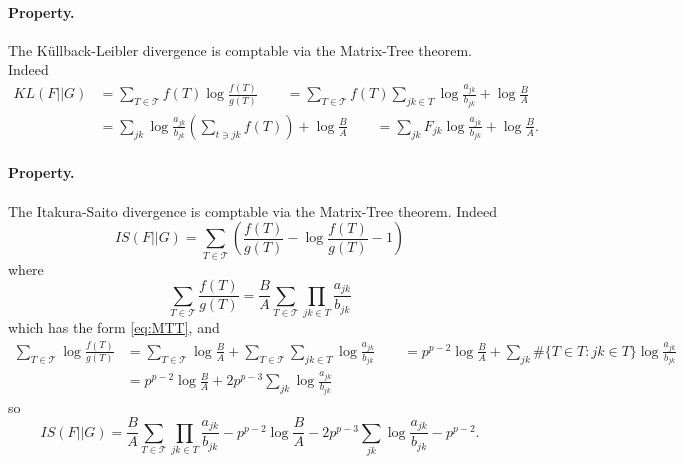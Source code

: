 \documentclass[a4paper, 10pt]{article}
\newcommand{\Tcal}{\mathcal{T}}
\begin{document}
\paragraph{Property.}  The Küllback-Leibler divergence is comptable via the Matrix-Tree theorem. Indeed
\begin{align*}
 KL(F || G) 
 & = \sum_{T \in \Tcal} f(T) \log \frac{f(T)}{g(T)} 
 \qquad = \sum_{T \in \Tcal}  f(T) \sum_{jk \in T} \log \frac{a_{jk}}{b_{jk}} + \log \frac{B}{A} \\
 & = \sum_{jk} \log \frac{a_{jk}}{b_{jk}} \left(\sum_{t \ni jk} f(T) \right) 
 + \log \frac{B}{A} 
 \qquad = \sum_{jk} F_{jk} \log \frac{a_{jk}}{b_{jk}} + \log \frac{B}{A}.
\end{align*}


\paragraph{Property.}  The Itakura-Saito divergence is comptable via the Matrix-Tree theorem. Indeed
$$
IS(F || G) 
= \sum_{T \in \Tcal} \left( \frac{f(T)}{g(T)} - \log \frac{f(T)}{g(T)} - 1 \right)
$$
where
$$
\sum_{T \in \Tcal} \frac{f(T)}{g(T)}
= \frac{B}{A} \sum_{T \in \Tcal}  \prod_{jk \in T} \frac{a_{jk}}{b_{jk}}
$$
which has the form \eqref{eq:MTT}, and
\begin{align*}
 \sum_{T \in \Tcal} \log \frac{f(T)}{g(T)} 
 & = \sum_{T \in \Tcal} \log \frac{B}{A} + \sum_{T \in \Tcal} \sum_{jk \in T} \log \frac{a_{jk}}{b_{jk}} 
 \qquad = p^{p-2} \log \frac{B}{A} + \sum_{jk} \#\{T \in T: jk \in T\} \log \frac{a_{jk}}{b_{jk}}  \\
 & = p^{p-2} \log \frac{B}{A} + 2p^{p-3}\sum_{jk} \log \frac{a_{jk}}{b_{jk}} 
\end{align*}
so
$$
IS(F || G) 
= \frac{B}{A} \sum_{T \in \Tcal} \prod_{jk \in T} \frac{a_{jk}}{b_{jk}} 
- p^{p-2} \log \frac{B}{A} - 2p^{p-3}\sum_{jk} \log \frac{a_{jk}}{b_{jk}}
- p^{p-2}.
$$





\end{document}
